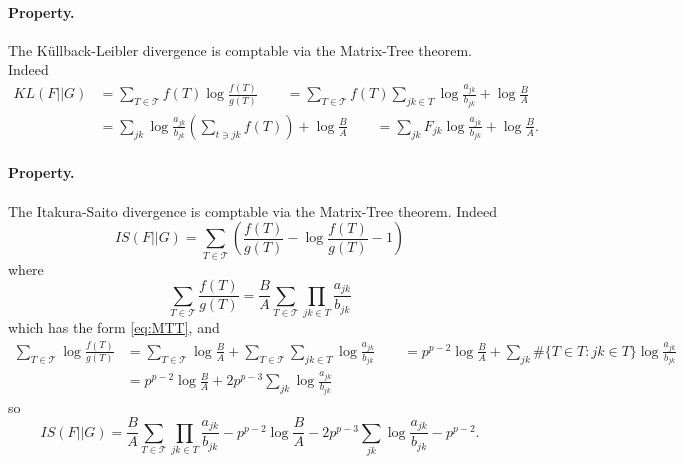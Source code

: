 \documentclass[a4paper, 10pt]{article}
\newcommand{\Tcal}{\mathcal{T}}
\begin{document}
\paragraph{Property.}  The Küllback-Leibler divergence is comptable via the Matrix-Tree theorem. Indeed
\begin{align*}
 KL(F || G) 
 & = \sum_{T \in \Tcal} f(T) \log \frac{f(T)}{g(T)} 
 \qquad = \sum_{T \in \Tcal}  f(T) \sum_{jk \in T} \log \frac{a_{jk}}{b_{jk}} + \log \frac{B}{A} \\
 & = \sum_{jk} \log \frac{a_{jk}}{b_{jk}} \left(\sum_{t \ni jk} f(T) \right) 
 + \log \frac{B}{A} 
 \qquad = \sum_{jk} F_{jk} \log \frac{a_{jk}}{b_{jk}} + \log \frac{B}{A}.
\end{align*}


\paragraph{Property.}  The Itakura-Saito divergence is comptable via the Matrix-Tree theorem. Indeed
$$
IS(F || G) 
= \sum_{T \in \Tcal} \left( \frac{f(T)}{g(T)} - \log \frac{f(T)}{g(T)} - 1 \right)
$$
where
$$
\sum_{T \in \Tcal} \frac{f(T)}{g(T)}
= \frac{B}{A} \sum_{T \in \Tcal}  \prod_{jk \in T} \frac{a_{jk}}{b_{jk}}
$$
which has the form \eqref{eq:MTT}, and
\begin{align*}
 \sum_{T \in \Tcal} \log \frac{f(T)}{g(T)} 
 & = \sum_{T \in \Tcal} \log \frac{B}{A} + \sum_{T \in \Tcal} \sum_{jk \in T} \log \frac{a_{jk}}{b_{jk}} 
 \qquad = p^{p-2} \log \frac{B}{A} + \sum_{jk} \#\{T \in T: jk \in T\} \log \frac{a_{jk}}{b_{jk}}  \\
 & = p^{p-2} \log \frac{B}{A} + 2p^{p-3}\sum_{jk} \log \frac{a_{jk}}{b_{jk}} 
\end{align*}
so
$$
IS(F || G) 
= \frac{B}{A} \sum_{T \in \Tcal} \prod_{jk \in T} \frac{a_{jk}}{b_{jk}} 
- p^{p-2} \log \frac{B}{A} - 2p^{p-3}\sum_{jk} \log \frac{a_{jk}}{b_{jk}}
- p^{p-2}.
$$





\end{document}
